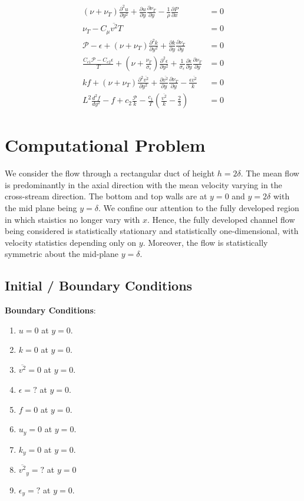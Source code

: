 \documentclass[12pt]{article}
\newcommand{\ep}{\epsilon} \newcommand{\noi}{\noindent}
\newcommand{\pr}{\partial}
\begin{document}
\begin{align}
	(\nu + \nu_T) \frac{\pr^2 u}{\pr y^2} + \frac{\pr u}{\pr y}
	\frac{\pr \nu_T}{\pr y} - \frac{1}{\rho} \frac{\pr P }{\pr x} &= 0 \\
	\nu_T - C_\mu \overline{v^2} T &=0 \\
	\mathcal{P} - \ep + (\nu+ \nu_T) \frac{\pr^2 k }{\pr y^2} +
	\frac{\pr k}{\pr y} \frac{\pr \nu_T}{\pr y} &=0\\
	\frac{C_{\ep 1 } \mathcal{P} - C_{\ep 2 } \ep}{T} + \left(\nu +
	\frac{\nu_T}{ \sigma_\ep}
	\right) \frac{\pr^2 \ep}{\pr y^2 } + \frac{1}{\sigma_\ep}
	\frac{\pr \ep}{\pr y} \frac{\pr \nu_T}{\pr y} &= 0 \\
	kf + (\nu + \nu_T) \frac{\pr^2 \overline{v^2}}{\pr y^2} +
	\frac{\pr \overline{v^2}}{\pr y} \frac{\pr \nu_T}{\pr y} -
	\frac{\ep \overline{v^2}}{k} &= 0 \\
	L^2 \frac{d^2 f }{dy^2} - f + c_2 \frac{\mathcal{P}}{k} -
	\frac{c_1}{T} \left( \frac{\overline{v^2}}{k} - \frac{2}{3}\right) &=0
	\label{eq:ssv2f}
\end{align}


\section{Computational Problem} 

We consider the flow through a rectangular duct of height $h=2 \delta$. The mean
flow is predominantly in the axial direction with the mean velocity varying in
the cross-stream direction. The bottom and top walls are at $y = 0$ and $y =
2 \delta$ with the mid plane being $y = \delta$. We confine our attention to the
fully developed region in which staistics no longer vary with $x$. Hence, the
fully developed channel flow being considered is statistically stationary and
statistically one-dimensional, with velocity statistics depending only on $y$.
Moreover, the flow is statistically symmetric about the mid-plane $y = \delta$. 


\subsection{Initial / Boundary Conditions} 

\textbf{Boundary Conditions}:

\begin{enumerate}
	\item $ u = 0$ at $y = 0$. 
	\item $ k = 0$ at $y = 0$. 
	\item $ \overline{v^2} = 0$ at $y = 0$. 
	\item $ \ep = ?$ at $y = 0$. 
	\item $ f = 0$ at $ y = 0$.
	\item $u_y = 0$ at $y = 0$.
	\item $k_y = 0$ at $y = 0$. 
	\item $\overline{v^2}_y = ?$ at $y = 0$
	\item $\ep_y = ?$ at $y = 0 $. 
\end{enumerate}
\end{document}
